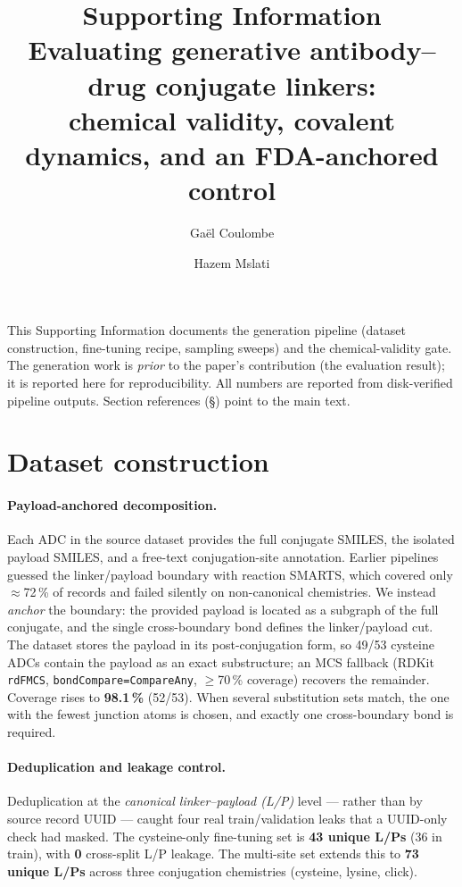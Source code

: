 \documentclass[10pt]{article}
\title{\textbf{\color{ink}Supporting Information}\\[0.3em]
\large Evaluating generative antibody--drug conjugate linkers:\\
chemical validity, covalent dynamics, and an FDA-anchored control}
\author{Ga\"el Coulombe \and Hazem Mslati}
\date{}
\begin{document}
\maketitle

\noindent
This Supporting Information documents the generation pipeline (dataset construction, fine-tuning recipe,
sampling sweeps) and the chemical-validity gate. The generation work is \emph{prior} to the paper's
contribution (the evaluation result); it is reported here for reproducibility. All numbers are reported
from disk-verified pipeline outputs. Section references (\S) point to the main text.

\tableofcontents
\vspace{1em}

\section{Dataset construction}
\label{si:data}

\paragraph{Payload-anchored decomposition.}
Each ADC in the source dataset\cite{mslati2026} provides the full conjugate SMILES, the isolated payload
SMILES, and a free-text conjugation-site annotation. Earlier pipelines guessed the linker/payload
boundary with reaction SMARTS, which covered only $\approx$72\,\% of records and failed silently on
non-canonical chemistries. We instead \emph{anchor} the boundary: the provided payload is located as a
subgraph of the full conjugate, and the single cross-boundary bond defines the linker/payload cut. The
dataset stores the payload in its post-conjugation form, so 49/53 cysteine ADCs contain the payload as an
exact substructure; an MCS fallback (RDKit \texttt{rdFMCS}, \texttt{bondCompare=CompareAny}, $\geq$70\,\%
coverage) recovers the remainder. Coverage rises to \textbf{98.1\,\%} (52/53). When several substitution
sets match, the one with the fewest junction atoms is chosen, and exactly one cross-boundary bond is
required.

\paragraph{Deduplication and leakage control.}
Deduplication at the \emph{canonical linker--payload (L/P)} level --- rather than by source record UUID
--- caught four real train/validation leaks that a UUID-only check had masked. The cysteine-only
fine-tuning set is \textbf{43 unique L/Ps} (36 in train), with \textbf{0} cross-split L/P leakage. The
multi-site set extends this to \textbf{73 unique L/Ps} across three conjugation chemistries (cysteine,
lysine, click).
\end{document}
